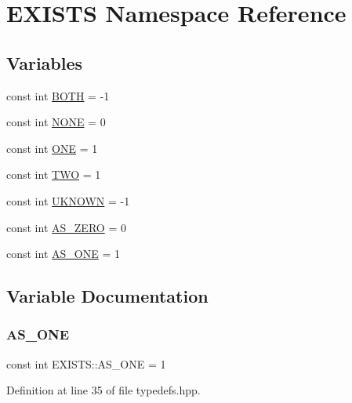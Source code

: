 \hypertarget{namespace_e_x_i_s_t_s}{}\section{E\+X\+I\+S\+TS Namespace Reference}
\label{namespace_e_x_i_s_t_s}
\subsection*{Variables}
\begin{DoxyCompactItemize}
\item 
const int \hyperlink{namespace_e_x_i_s_t_s_a256db431572e1e7f26f8dfa6c9cae9bd}{B\+O\+TH} = -\/1
\item 
const int \hyperlink{namespace_e_x_i_s_t_s_a2f75d813424980b47f3e7c9608fb8416}{N\+O\+NE} = 0
\item 
const int \hyperlink{namespace_e_x_i_s_t_s_a4c3717397d716d2bbd69d8239b3de033}{O\+NE} = 1
\item 
const int \hyperlink{namespace_e_x_i_s_t_s_ad76d02e8eb6d20715d333b72394b0648}{T\+WO} = 1
\item 
const int \hyperlink{namespace_e_x_i_s_t_s_a81eb362d951445c658942a433afddb97}{U\+K\+N\+O\+WN} = -\/1
\item 
const int \hyperlink{namespace_e_x_i_s_t_s_a03d550dd049f50f852b8fb4caa48238a}{A\+S\+\_\+\+Z\+E\+RO} = 0
\item 
const int \hyperlink{namespace_e_x_i_s_t_s_a735e5ca6565905e84346e3ff62842a0a}{A\+S\+\_\+\+O\+NE} = 1
\end{DoxyCompactItemize}


\subsection{Variable Documentation}
\mbox{\label{namespace_e_x_i_s_t_s_a735e5ca6565905e84346e3ff62842a0a}} 
\subsubsection{\texorpdfstring{A\+S\+\_\+\+O\+NE}{AS\_ONE}}
{\footnotesize\ttfamily const int E\+X\+I\+S\+T\+S\+::\+A\+S\+\_\+\+O\+NE = 1}



Definition at line 35 of file typedefs.\+hpp.

